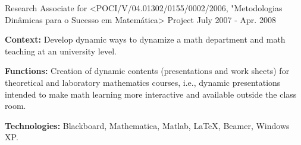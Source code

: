 \begin{cventries}
  \cventry    
    {Research Associate for <POCI/V/04.01302/0155/0002/2006, "Metodologias Din\^amicas para o Sucesso em Matem\'atica> Project} %
    {} %
    {} %
    {July 2007 - Apr. 2008} %
    {
      \begin{cvitems} %
		\item[] {\textbf{Context:} Develop dynamic ways to dynamize a math department and math teaching at an university level.}
		\item[] {\textbf{Functions:} Creation of dynamic contents (presentations and work sheets) for theoretical and laboratory mathematics courses, i.e., dynamic presentations intended to make math learning more interactive and available outside the class room.}
  		\item[] {\textbf{Technologies:} \textcolor{rainbowcolor-green}{Blackboard}, \textcolor{rainbowcolor-green}{Mathematica}, \textcolor{rainbowcolor-green}{Matlab}, \textcolor{rainbowcolor-green}{LaTeX}, \textcolor{rainbowcolor-green}{Beamer}, %
  		\textcolor{rainbowcolor-orange}{Windows XP}.}
      \end{cvitems}
    }  
     
\end{cventries}

\vspace{5.0cm}
